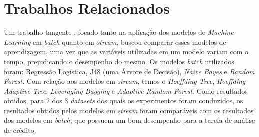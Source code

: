 \section{Trabalhos Relacionados}

Um trabalho tangente \cite{b1}, focado tanto na aplicação dos modelos de \textit{Machine Learning} em \textit{batch} quanto em \textit{stream}, buscou comparar esses modelos de aprendizagem, uma vez que as variáveis utilizadas em um modelo variam com o tempo, prejudicando o desempenho do mesmo. Os modelos \textit{batch} utilizados foram: Regressão Logística, J48 (uma Árvore de Decisão), \textit{Naive Bayes} e \textit{Random Forest}. Com relação aos modelos em \textit{stream}, temos o \textit{Hoeffding Tree}, \textit{Hoeffding Adaptive Tree}, \textit{Leveraging Bagging} e \textit{Adaptive Random Forest}. Como resultados obtidos, para 2 dos 3 \textit{datasets} dos quais os experimentos foram conduzidos, os resultados obtidos pelos modelos em \textit{stream} foram comparáveis com os resultados dos modelos em \textit{batch}, que possuem um bom desempenho para a tarefa de análise de crédito.